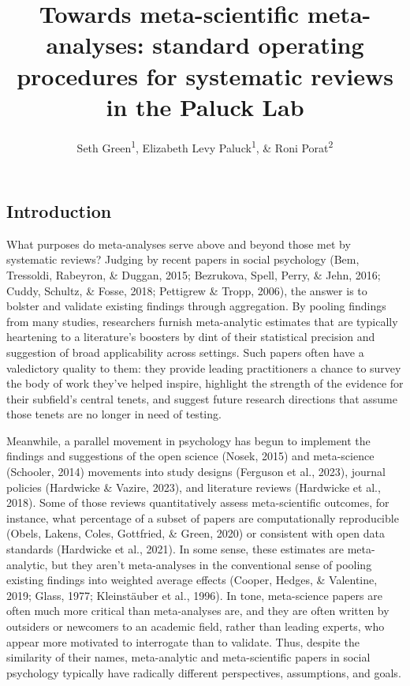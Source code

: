\documentclass[
  man]{apa6}
\title{Towards meta-scientific meta-analyses: standard operating procedures for systematic reviews in the Paluck Lab}
\author{Seth Green\textsuperscript{1}, Elizabeth Levy Paluck\textsuperscript{1}, \& Roni Porat\textsuperscript{2}}
\date{}
\affiliation{\vspace{0.5cm}\textsuperscript{1} Princeton University\\\textsuperscript{2} Hebrew University, Jerusalem}
\begin{document}
\maketitle

\subsection{Introduction}\label{introduction}

What purposes do meta-analyses serve above and beyond those met by systematic reviews? Judging by recent papers in social psychology (Bem, Tressoldi, Rabeyron, \& Duggan, 2015; Bezrukova, Spell, Perry, \& Jehn, 2016; Cuddy, Schultz, \& Fosse, 2018; Pettigrew \& Tropp, 2006), the answer is to bolster and validate existing findings through aggregation. By pooling findings from many studies, researchers furnish meta-analytic estimates that are typically heartening to a literature's boosters by dint of their statistical precision and suggestion of broad applicability across settings. Such papers often have a valedictory quality to them: they provide leading practitioners a chance to survey the body of work they've helped inspire, highlight the strength of the evidence for their subfield's central tenets, and suggest future research directions that assume those tenets are no longer in need of testing.

Meanwhile, a parallel movement in psychology has begun to implement the findings and suggestions of the open science (Nosek, 2015) and meta-science (Schooler, 2014) movements into study designs (Ferguson et al., 2023), journal policies (Hardwicke \& Vazire, 2023), and literature reviews (Hardwicke et al., 2018). Some of those reviews quantitatively assess meta-scientific outcomes, for instance, what percentage of a subset of papers are computationally reproducible (Obels, Lakens, Coles, Gottfried, \& Green, 2020) or consistent with open data standards (Hardwicke et al., 2021). In some sense, these estimates are meta-analytic, but they aren't meta-analyses in the conventional sense of pooling existing findings into weighted average effects (Cooper, Hedges, \& Valentine, 2019; Glass, 1977; Kleinstäuber et al., 1996). In tone, meta-science papers are often much more critical than meta-analyses are, and they are often written by outsiders or newcomers to an academic field, rather than leading experts, who appear more motivated to interrogate than to validate. Thus, despite the similarity of their names, meta-analytic and meta-scientific papers in social psychology typically have radically different perspectives, assumptions, and goals.
\end{document}
